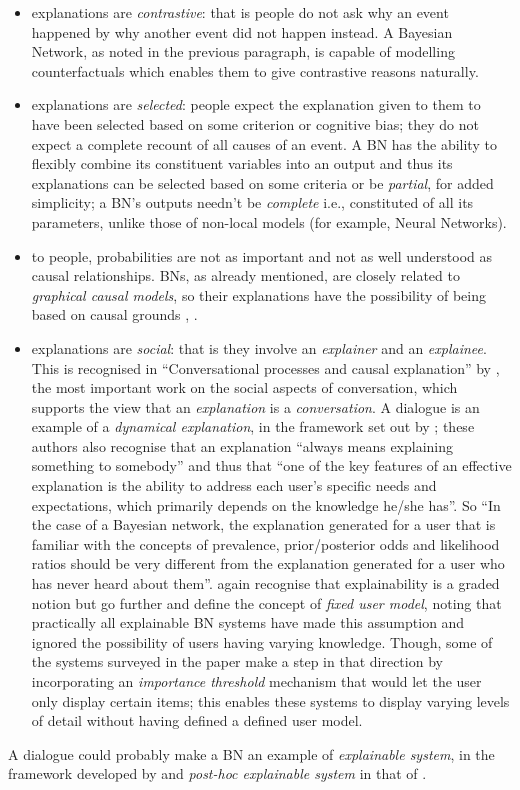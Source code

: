 \begin{itemize}
  \item explanations are \textit{contrastive}: that is people do not ask why an event happened by why another event did not happen instead.  
  A Bayesian Network, as noted in the previous paragraph, is capable of modelling counterfactuals which enables them to give contrastive reasons naturally.
  \item explanations are \textit{selected}: people expect the explanation given to them to have been selected based on some criterion or cognitive bias; they do not expect a complete recount of all causes of an event.
  A BN has the ability to flexibly combine its constituent variables into an output and thus its explanations can be selected based on some criteria or be \textit{partial}, for added simplicity; a BN's outputs needn't be \textit{complete} i.e., constituted of all its parameters, unlike those of non-local models (for example, Neural Networks).
  \item to people, probabilities are not as important and not as well understood as causal relationships.
  BNs, as already mentioned, are closely related to \textit{graphical causal models}, so their explanations have the possibility of being based on causal grounds \citep{Lipton2016}, \citet{rani2006empirical}.
  \item explanations are \textit{social}: that is they involve an \textit{explainer} and an \textit{explainee}.  
  This is recognised in \enquote{Conversational processes and causal explanation} by \citet{Hilton1990}, the most important work on the social aspects of conversation, which supports the view that an \textit{explanation} is a \textit{conversation}. 
  A dialogue is an example of a \textit{dynamical explanation}, in the framework set out by \citet{lacave2002review}; these authors also recognise that an explanation \enquote{always means explaining something to somebody} and thus that \enquote{one of the key features of an effective explanation is the ability to address each user's specific needs and expectations, which primarily depends on the knowledge he/she has}.
  	  So \enquote{In the case of a Bayesian network, the explanation generated for a user that is familiar with the concepts of prevalence, prior/posterior odds and likelihood ratios should be very different from the explanation generated for a user who has never heard about them}.
  	  \citet{lacave2002review} again recognise that explainability is a graded notion but go further and define the concept of \textit{fixed user model}, noting that practically all explainable BN systems have made this assumption and ignored the possibility of users having varying knowledge.
  	  Though, some of the systems surveyed in the paper make a step in that direction by incorporating an \textit{importance threshold} mechanism that would let the user only display certain items; this enables these systems to display varying levels of detail without having defined a defined user model.
\end{itemize}
A dialogue could probably make a BN an example of \textit{explainable system}, in the framework developed by \citet{Doran2018} and \textit{post-hoc explainable system} in that of \citet{mittelstadt2019explaining}.

